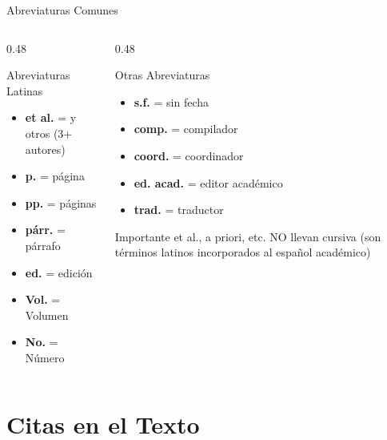 \documentclass[spanish,aspectratio=169]{beamer}
\begin{document}
	\begin{frame}{Abreviaturas Comunes}
		\begin{columns}[T]
			\begin{column}{0.48\textwidth}
				\begin{block}{Abreviaturas Latinas}
					\begin{itemize}
						\item \textbf{et al.} = y otros (3+ autores)
						\item \textbf{p.} = página
						\item \textbf{pp.} = páginas
						\item \textbf{párr.} = párrafo
						\item \textbf{ed.} = edición
						\item \textbf{Vol.} = Volumen
						\item \textbf{No.} = Número
					\end{itemize}
				\end{block}
			\end{column}
			
			\begin{column}{0.48\textwidth}
				\begin{block}{Otras Abreviaturas}
					\begin{itemize}
						\item \textbf{s.f.} = sin fecha
						\item \textbf{comp.} = compilador
						\item \textbf{coord.} = coordinador
						\item \textbf{ed. acad.} = editor académico
						\item \textbf{trad.} = traductor
					\end{itemize}
				\end{block}
				
				\begin{alertblock}{Importante}
					et al., a priori, etc. NO llevan cursiva (son términos latinos incorporados al español académico)
				\end{alertblock}
			\end{column}
		\end{columns}
	\end{frame}
	
	\section{Citas en el Texto}
	
\end{document}
